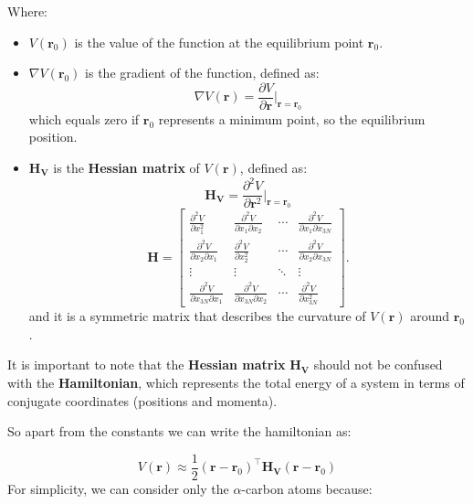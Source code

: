 \documentclass[English, Lau, oneside]{sapthesis}
\begin{document}
Where:
\begin{itemize}
    \item \( V(\mathbf{r}_0) \) is the value of the function at the equilibrium point \( \mathbf{r}_0 \).
    \item \( \nabla V(\mathbf{r}_0) \) is the gradient of the function, defined as:
    \begin{equation}
    \nabla V(\mathbf{r}) = \frac{\partial V}{\partial \mathbf{r}} \bigg|_{\mathbf{r} = \mathbf{r}_0}
    \end{equation}
    which equals zero if \( \mathbf{r}_0 \) represents a minimum point, so the equilibrium position.
    \item \( \mathbf{H_V} \) is the \textbf{Hessian matrix} of \( V(\mathbf{r}) \), defined as:
    \begin{equation}
		\mathbf{H_V} = \frac{\partial^2 V}{\partial \mathbf{r}^2} \bigg|_{\mathbf{r} = \mathbf{r}_0}
    \end{equation}
    \[
    \mathbf{H} = \begin{bmatrix}
    \frac{\partial^2 V}{\partial x_1^2} & \frac{\partial^2 V}{\partial x_1 \partial x_2} & \cdots & \frac{\partial^2 V}{\partial x_1 \partial x_{3N}} \\
    \frac{\partial^2 V}{\partial x_2 \partial x_1} & \frac{\partial^2 V}{\partial x_2^2} & \cdots & \frac{\partial^2 V}{\partial x_2 \partial x_{3N}} \\
    \vdots & \vdots & \ddots & \vdots \\
    \frac{\partial^2 V}{\partial x_{3N} \partial x_1} & \frac{\partial^2 V}{\partial x_{3N} \partial x_2} & \cdots & \frac{\partial^2 V}{\partial x_{3N}^2}
    \end{bmatrix}.
    \]
    and it is a symmetric matrix that describes the curvature of \( V(\mathbf{r}) \) around \( \mathbf{r}_0 \).
\end{itemize}

It is important to note that the \textbf{Hessian matrix} \( \mathbf{H_V} \) should not be confused with the \textbf{Hamiltonian}, which represents the total energy of a system in terms of conjugate coordinates (positions and momenta).

So apart from the constants we can write the hamiltonian as:

\begin{equation}
	V(\mathbf{r}) \approx\frac{1}{2} (\mathbf{r} - \mathbf{r}_0)^\top \mathbf{H_V} (\mathbf{r} - \mathbf{r}_0) \label{1.1}
\end{equation}
For simplicity, we can consider only the \(\alpha\)-carbon atoms because:
\end{document}
